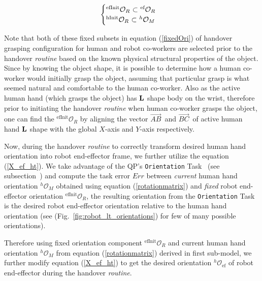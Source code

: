 \begin{equation}\label{fixedOri}
\begin{cases}
{{}^\text{efInit}\mathcal{O}_R}$ $\subset$ ${{}^{\text{ef}}\mathcal{O}_R} \\
{{}^\text{hInit}\mathcal{O}_R}$ $\subset$ ${{}^{h}\mathcal{O}_M}
\end{cases}
\end{equation}

Note that both of these fixed subsets in equation (\ref{fixedOri}) of handover grasping configuration for human and robot co-workers are selected prior to the handover \textit{routine} based on the known physical structural properties of the object. Since by knowing the object shape, it is possible to determine how a human co-worker would initially grasp the object, assuming that particular grasp is what seemed natural and comfortable to the human co-worker. Also as the active human hand (which grasps the object) has ${\bf L}$ shape body on the wrist, therefore prior to initiating the handover \textit{routine} when human co-worker grasps the object, one can find the ${{}^\text{efInit}\mathcal{O}_R}$ by aligning the vector $\vec{AB}^{\,}$ and $\vec{BC}^{\,}$ of active human hand ${\bf L}$ shape with the global $X$-axis and $Y$-axis respectively.

Now, during the handover \textit{routine} to correctly transform desired human hand orientation into robot end-effector frame, we further utilize the equation (\ref{X_ef_ht}). We take advantage of the QP's \texttt{Orientation} Task~\cite{murray2017mathematical, ladder-HRP-2Kai} (see subsection~) and compute the task error $Err$ between \textit{current} human hand orientation ${{}^{h}\mathcal{O}_M}$ obtained using equation (\ref{rotationmatrix}) and \textit{fixed} robot end-effector orientation ${{}^\text{efInit}\mathcal{O}_R}$, the resulting orientation from the \texttt{Orientation} Task is the desired robot end-effector orientation relative to the human hand orientation (see (Fig.~\ref{fig:robot_lt_orientations}) for few of many possible orientations).

Therefore using fixed orientation component  ${{}^\text{efInit}\mathcal{O}_R}$ and current human hand orientation ${}^{h}\mathcal{O}_M$ from equation (\ref{rotationmatrix}) derived in first sub-model, we further modify equation (\ref{X_ef_ht}) to get the desired orientation $ {}^{h}\mathcal{O}_{\text{ef}} $ of robot end-effector during the handover \textit{routine}.


